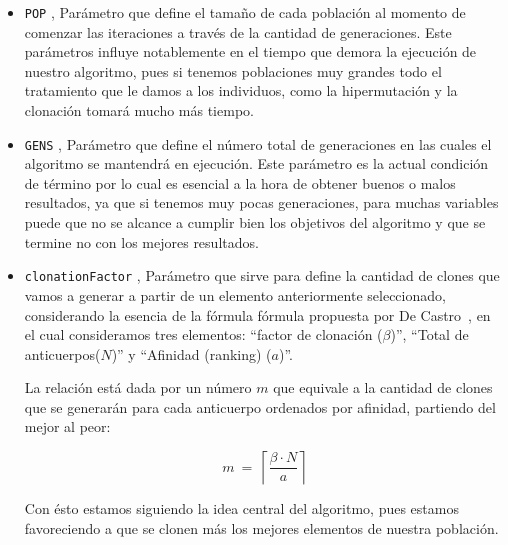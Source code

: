 %

\begin{itemize}
	\item \texttt{POP} \blue{[10,210]}, Parámetro que define el tamaño de cada población al momento de comenzar
			las iteraciones a través de la cantidad de generaciones.
			Este parámetros influye notablemente en el tiempo que demora la ejecución de nuestro algoritmo,
			pues si tenemos poblaciones muy grandes todo el tratamiento que le damos a los individuos,
			como la hipermutación y la clonación tomará mucho más tiempo.

	\item \texttt{GENS} \blue{[10,2000,30]}, Parámetro que define el número total de generaciones en las cuales
			el algoritmo se mantendrá en ejecución. Este parámetro es la actual condición de término
			por lo cual es esencial a la hora de obtener buenos o malos resultados, ya que si tenemos
			muy pocas generaciones, para muchas variables puede que no se alcance a cumplir bien los
			objetivos del algoritmo y que se termine no con los mejores resultados.

	\item \texttt{clonationFactor} \blue{[0,1]} \red{$(\beta)$}, Parámetro que sirve para define la cantidad de clones
			que vamos a generar a partir de un elemento anteriormente seleccionado, considerando la esencia de la
			fórmula fórmula propuesta por De Castro~\cite{decastro}, en el cual consideramos tres elementos:
			``factor de clonación ($\beta$)'', ``Total de anticuerpos($N$)'' y ``Afinidad (ranking) ($a$)''.
			
			La relación está dada por un número $m$ que equivale a la cantidad de clones que se generarán
            para cada anticuerpo ordenados por afinidad, partiendo del mejor al peor:

            $$m\ =\ \left\lceil\frac{\beta \cdot N}{a}\right\rceil$$

            Con ésto estamos siguiendo la idea central del algoritmo, pues estamos favoreciendo a que se clonen más
            los mejores elementos de nuestra población.


\end{itemize}
